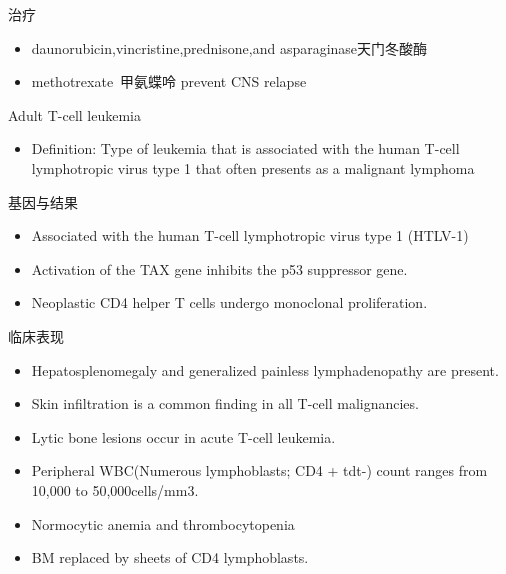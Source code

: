 \documentclass[
  ignorenonframetext,
]{beamer}
\providecommand{\tightlist}{%
  \setlength{\itemsep}{0pt}\setlength{\parskip}{0pt}}
\begin{document}
\begin{frame}
\begin{block}{治疗}
\protect\hypertarget{ux6cbbux7597-7}{}
\begin{itemize}
\item
  daunorubicin,vincristine,prednisone,and asparaginase天门冬酸酶
\item
  methotrexate~甲氨蝶呤 prevent CNS relapse
\end{itemize}
\end{block}
\end{frame}

\begin{frame}
\begin{block}{Adult T-cell leukemia}
\protect\hypertarget{adult-t-cell-leukemia}{}
\begin{itemize}
\tightlist
\item
  Definition: Type of leukemia that is associated with the human T-cell
  lymphotropic virus type 1 that often presents as a malignant lymphoma
\end{itemize}
\end{block}
\end{frame}

\begin{frame}
\begin{block}{基因与结果}
\protect\hypertarget{ux57faux56e0ux4e0eux7ed3ux679c}{}
\begin{itemize}
\item
  Associated with the human T-cell lymphotropic virus type 1 (HTLV-1)
\item
  Activation of the TAX gene inhibits the p53 suppressor gene.
\item
  Neoplastic CD4 helper T cells undergo monoclonal proliferation.
\end{itemize}
\end{block}
\end{frame}

\begin{frame}
\begin{block}{临床表现}
\protect\hypertarget{ux4e34ux5e8aux8868ux73b0-7}{}
\begin{itemize}
\item
  Hepatosplenomegaly and generalized painless lymphadenopathy are
  present.
\item
  Skin infiltration is a common finding in all T-cell malignancies.
\item
  Lytic bone lesions occur in acute T-cell leukemia.
\item
  Peripheral WBC(Numerous lymphoblasts; CD4 + tdt-) count ranges from
  10,000 to 50,000cells/mm3.
\item
  Normocytic anemia and thrombocytopenia
\item
  BM replaced by sheets of CD4 lymphoblasts.
\end{itemize}
\end{block}
\end{frame}
\end{document}
